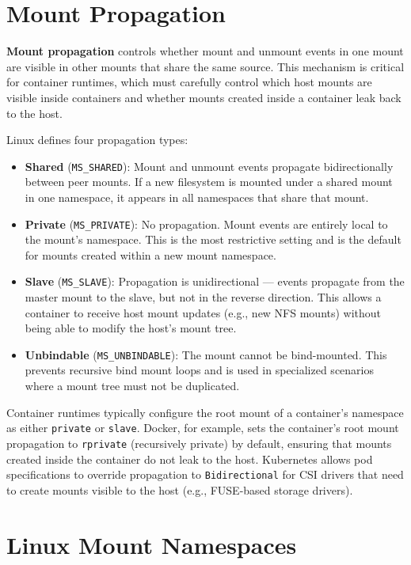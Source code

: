 \section{Mount Propagation}

\textbf{Mount propagation} controls whether mount and unmount events in one mount are visible in other mounts that share the same source. This mechanism is critical for container runtimes, which must carefully control which host mounts are visible inside containers and whether mounts created inside a container leak back to the host.

Linux defines four propagation types:

\begin{itemize}
  \item \textbf{Shared} (\texttt{MS\_SHARED}): Mount and unmount events propagate bidirectionally between peer mounts. If a new filesystem is mounted under a shared mount in one namespace, it appears in all namespaces that share that mount.
  \item \textbf{Private} (\texttt{MS\_PRIVATE}): No propagation. Mount events are entirely local to the mount's namespace. This is the most restrictive setting and is the default for mounts created within a new mount namespace.
  \item \textbf{Slave} (\texttt{MS\_SLAVE}): Propagation is unidirectional --- events propagate from the master mount to the slave, but not in the reverse direction. This allows a container to receive host mount updates (e.g., new NFS mounts) without being able to modify the host's mount tree.
  \item \textbf{Unbindable} (\texttt{MS\_UNBINDABLE}): The mount cannot be bind-mounted. This prevents recursive bind mount loops and is used in specialized scenarios where a mount tree must not be duplicated.
\end{itemize}

Container runtimes typically configure the root mount of a container's namespace as either \texttt{private} or \texttt{slave}. Docker, for example, sets the container's root mount propagation to \texttt{rprivate} (recursively private) by default, ensuring that mounts created inside the container do not leak to the host. Kubernetes allows pod specifications to override propagation to \texttt{Bidirectional} for CSI drivers that need to create mounts visible to the host (e.g., FUSE-based storage drivers).

\section{Linux Mount Namespaces}


